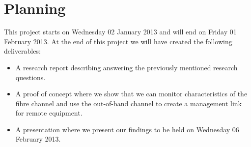 \documentclass{article}
\begin{document}
\section{Planning}
This project starts on Wednesday 02 January 2013 and will end on Friday 01 February 2013. 
At the end of this project we will have created the following deliverables:
\begin{itemize}
\item A research report describing answering the previously mentioned research questions.
\item A proof of concept where we show that we can monitor characteristics of the fibre channel and use the out-of-band channel to create a management link for remote equipment.
\item A presentation where we present our findings to be held on Wednesday 06 February 2013.
\end{itemize}
\end{document}
